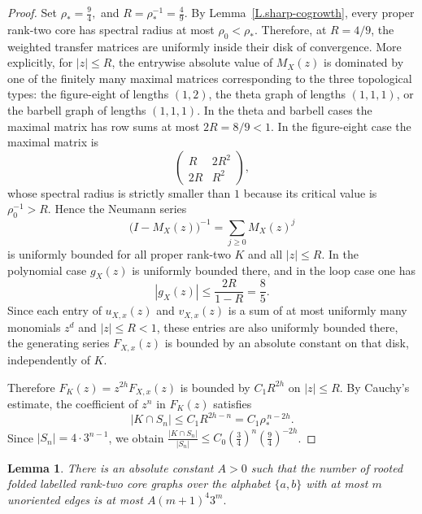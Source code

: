 \documentclass{amsproc}
\newtheorem{lemma}[theorem]{Lemma}
\begin{document}
\begin{proof}
Set
$
\rho_*=\frac94,
$ and
$       R=\rho_*^{-1}=\frac49.$
By Lemma~\ref{L.sharp-cogrowth}, every proper rank-two core has spectral radius
at most $\rho_0<\rho_*$.  Therefore, at $R=4/9$, the weighted transfer matrices
are uniformly inside their disk of convergence.  More explicitly, for
$|z|\leq R$, the entrywise absolute value of $M_X(z)$ is dominated by one of the
finitely many maximal matrices corresponding to the three topological types: the
figure-eight of lengths $(1,2)$, the theta graph of lengths $(1,1,1)$, or the
barbell graph of lengths $(1,1,1)$.  In the theta and barbell cases the maximal
matrix has row sums at most $2R=8/9<1$.  In the figure-eight case the maximal
matrix is
\[
        \begin{pmatrix}
                R & 2R^2 \\
                2R & R^2
        \end{pmatrix},
\]
whose spectral radius is strictly smaller than $1$ because its critical value is
$\rho_0^{-1}>R$.  Hence the Neumann series
\[
        \bigl(I-M_X(z)\bigr)^{-1}=\sum_{j\geq 0} M_X(z)^j
\]
is uniformly bounded for all proper rank-two $K$ and all $|z|\leq R$.
In the polynomial case $g_X(z)$ is uniformly bounded there, and in the loop case
one has
\[
        |g_X(z)|\leq \frac{2R}{1-R}=\frac{8}{5}.
\]
Since each entry of $u_{X,x}(z)$ and $v_{X,x}(z)$ is a sum of at most uniformly many
monomials $z^d$ and $|z|\leq R<1$, these entries are also uniformly bounded
there,
the generating series $F_{X,x}(z)$ is bounded by an absolute constant on that disk,
independently of $K$.

Therefore $F_K(z)=z^{2h}F_{X,x}(z)$ is bounded by $C_1R^{2h}$ on $|z|\leq R$.
By Cauchy's estimate, the coefficient of $z^n$ in $F_K(z)$ satisfies
\[
        |K\cap S_n|\leq C_1 R^{2h-n}=C_1 \rho_*^{\,n-2h}.
\]
Since $|S_n|=4\cdot 3^{n-1}$, we obtain
$\frac{|K\cap S_n|}{|S_n|}\leq C_0\left(\frac34\right)^n\left(\frac94\right)^{-2h}$.
\end{proof}

\begin{lemma}
        \label{L.count-cores}
There is an absolute constant $A>0$ such that the number of rooted folded
labelled rank-two core graphs over the alphabet $\{a,b\}$ with at most $m$
unoriented edges is at most
$
        A(m+1)^4 3^m.
$
\end{lemma}
\end{document}
